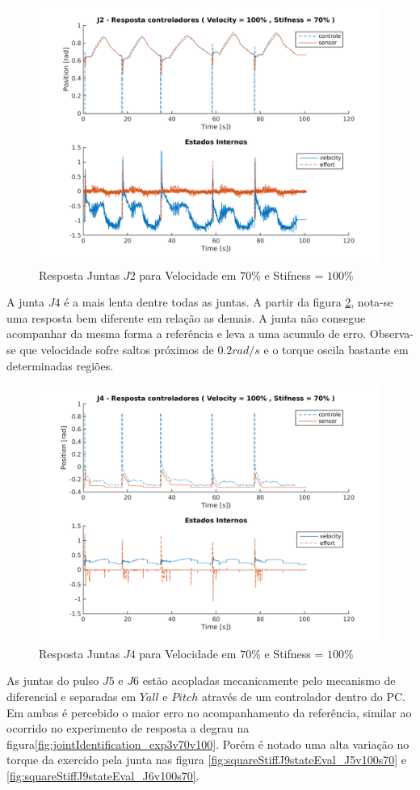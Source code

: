 \begin{figure}[H]
    \centering
    \includegraphics[width=0.6\linewidth,trim={2cm 1cm 2cm 2cm}]{tex/figs/squareStiffJ9stateEval_J2v100s70.png}
    \caption{Resposta Juntas $J2$ para Velocidade em $70\%$ e Stifness = $100\%$ }
    \label{fig:squareStiffJ9stateEval_J2v100s70}
\end{figure}

A junta $J4$ é a mais lenta dentre todas as juntas. A partir da figura \ref{fig:squareStiffJ9stateEval_J4v100s70}, nota-se uma resposta bem diferente em relação as demais. A junta não consegue acompanhar da mesma forma a referência e leva a uma acumulo de erro. Observa-se que velocidade sofre saltos próximos de $0.2 rad/s$ e o torque oscila bastante em determinadas regiões.

\vspace{1cm}

\begin{figure}[H]
    \centering
    \includegraphics[width=0.6\linewidth,trim={2cm 1cm 2cm 2cm}]{tex/figs/squareStiffJ9stateEval_J4v100s70.png}
    \caption{Resposta Juntas $J4$ para Velocidade em $70\%$ e Stifness = $100\%$ }
    \label{fig:squareStiffJ9stateEval_J4v100s70}
\end{figure}

As juntas do pulso $J5$ e $J6$ estão acopladas mecanicamente pelo mecanismo de diferencial e separadas em $Yall$ e $Pitch$ através de um controlador dentro do PC. Em ambas é percebido o maior erro no acompanhamento da referência, similar ao ocorrido no experimento de resposta a degrau na figura\ref{fig:jointIdentification_exp3v70v100}. Porém é notado uma alta variação no torque da exercido pela junta nas figura \ref{fig:squareStiffJ9stateEval_J5v100s70} e \ref{fig:squareStiffJ9stateEval_J6v100s70}.


